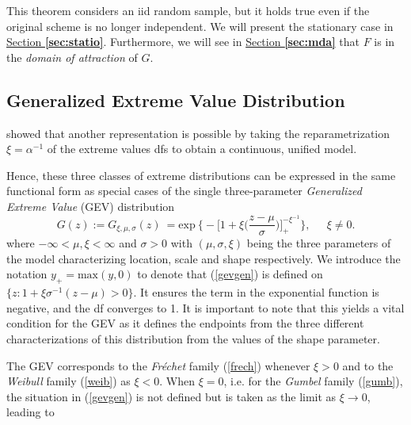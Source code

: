 This theorem considers an iid random sample, but it holds true even if the original scheme is no longer independent. We will present the stationary case in 
\hyperref[sec:statio]{Section \textbf{\ref{sec:statio}}}. Furthermore, we will see in \hyperref[sec:mda]{Section \textbf{\ref{sec:mda}}} that $F$ is in the \emph{domain of attraction} of $G$. %


\subsection{Generalized Extreme Value Distribution}\label{sec:gevdistri}

\citet{von_mises_distribution_1936} showed that another representation is possible by taking the reparametrization $\xi=\alpha^{-1}$ of the extreme values dfs to obtain a continuous, unified model.

Hence, these three classes of extreme distributions can be expressed in the same functional form as special cases of the single three-parameter \textit{Generalized Extreme Value} (GEV) distribution 
\begin{equation} \label{gevgen}
G(z):=G_{\xi,\mu,\sigma}(z)\ =\text{exp}\ \Bigg\{-\bigg[1+\xi\bigg(\frac{z-\mu}{\sigma}\bigg)\bigg]_+^{-\xi^{-1}}\Bigg\}, \quad \ \ \xi\neq 0.
\end{equation}
where $-\infty<\mu,\xi<\infty$ and $\sigma>0$ with $(\mu,\sigma,\xi)$ being the three parameters of the model characterizing location, scale and shape respectively. We introduce the notation $y_+=\text{max}(y,0)$ to denote that (\ref{gevgen}) is defined on $\big\{z:1+\xi\sigma^{-1}(z-\mu)>0\big\}$. It ensures the term in the exponential function is negative, and the df converges to 1. It is important to note that this yields a vital condition for the GEV as it defines the endpoints from the three different characterizations of this distribution from the values of the shape 
parameter. %

The GEV corresponds to the \emph{Fréchet} family (\ref{frech}) whenever $\xi>0$ and to the \emph{Weibull} family (\ref{weib}) as $\xi<0$.
When $\xi=0$, i.e. for the \emph{Gumbel} family (\ref{gumb}), the situation in (\ref{gevgen}) is not defined but is taken as the limit as $\xi\to 0$, leading to 

